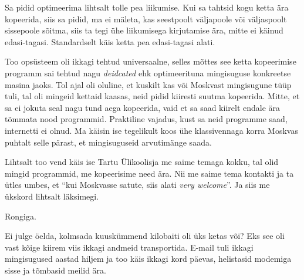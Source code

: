 
Sa pidid  optimeerima lihtsalt tolle pea liikumise. Kui sa tahtsid kogu ketta ära kopeerida, siis sa pidid, ma ei mäleta, kas seestpoolt väljapoole või väljaspoolt sissepoole sõitma, siis ta  tegi ühe liikumisega kirjutamise ära, mitte ei käinud edasi-tagasi. Standardselt käis ketta pea edasi-tagasi alati.


Too opsüsteem oli ikkagi  tehtud universaalne, selles mõttes see ketta kopeerimise programm sai tehtud nagu \emph{deidcated} ehk optimeerituna mingisuguse konkreetse masina jaoks. Tol ajal oli oluline, et  kuskilt kas või Moskvast mingisugune tüüp tuli, tal oli mingeid kettaid kaasas, neid pidid kiiresti suutma kopeerida. Mitte, et sa ei jokuta seal nagu tund aega kopeerida, vaid et sa saad  kiirelt endale ära tõmmata nood programmid. Praktiline vajadus, kust sa neid programme saad, internetti ei olnud. Ma käisin ise tegelikult koos ühe klassivennaga korra Moskvas puhtalt selle pärast, et mingisuguseid arvutimänge saada.


Lihtsalt too vend käis ise Tartu Ülikoolisja me saime temaga kokku, tal olid mingid programmid, me kopeerisime need ära. Nii me saime tema kontakti ja ta ütles umbes, et \enquote{kui Moskvasse satute, siis alati \emph{very welcome}}. Ja siis me ükskord lihtsalt läksimegi.


Rongiga. 


Ei julge öelda, kolmsada kuuskümmend kilobaiti oli üks ketas või? Eks see oli vast kõige kiirem viis ikkagi andmeid transportida. E-mail tuli ikkagi mingisugused aastad hiljem ja too käis ikkagi kord päevas, helistasid modemiga sisse ja tõmbasid meilid ära.

